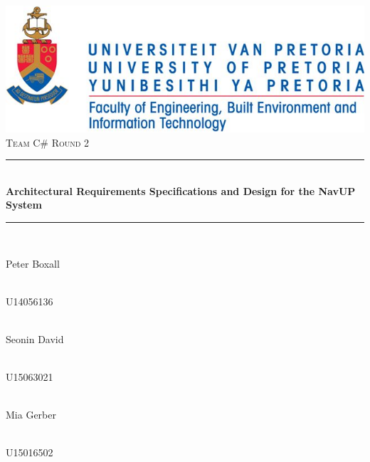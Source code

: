 \begin{titlepage}
	\begin{center}
		\includegraphics[width=0.7\linewidth]{uniLogo.jpg}\\[1cm]    
		\textsc{\LARGE Team C\# Round 2}\\[0.3cm]
		\rule{\linewidth}{0.5mm} \\[1cm]
		{ \huge \bfseries Architectural Requirements Specifications and Design for the NavUP System}\\[0.5cm]
		\rule{\linewidth}{0.5mm} \\[1cm] 			
		
		\begin{minipage}{0.4\textwidth}
			\begin{flushleft} \large
				Peter {Boxall}
			\end{flushleft}
		\end{minipage}
		\begin{minipage}{0.4\textwidth}
			\begin{flushright} \large
				\emph{} \\
				U14056136 
			\end{flushright}
		\end{minipage}
		
		
		\begin{minipage}{0.4\textwidth}
			\begin{flushleft} \large
				\emph{} \\
				Seonin {David}
			\end{flushleft}
		\end{minipage}
		\begin{minipage}{0.4\textwidth}
			\begin{flushright} \large
				\emph{} \\
				U15063021
			\end{flushright}
		\end{minipage}
		
		
		\begin{minipage}{0.4\textwidth}
			\begin{flushleft} \large
				\emph{} \\
				Mia {Gerber}
			\end{flushleft}
		\end{minipage}
		\begin{minipage}{0.4\textwidth}
			\begin{flushright} \large
				\emph{} \\
				U15016502
			\end{flushright}
		\end{minipage}
		

\end{center}
\end{titlepage}
